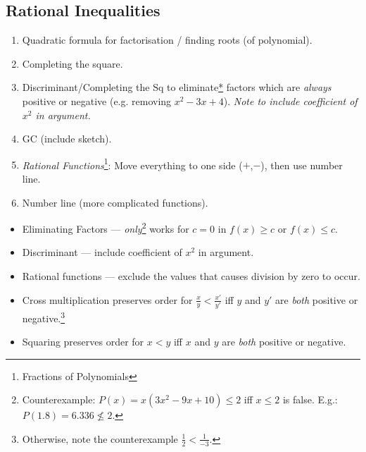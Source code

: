 \documentclass[oneside]{book}
\theoremstyle{definition}
\theoremstyle{plain}
\theoremstyle{remark}
\theoremstyle{plain}
\begin{document}
\subsection{Rational Inequalities}
\begin{tcolorbox}[
    colback=yellow!20,
    boxrule=1pt,
    boxsep=1pt,
    left=2pt,right=2pt,top=2pt,bottom=2pt,
    oversize=2pt,
    colframe=blue!75!black,
    before skip=\topsep,
    after skip=\topsep,
    title=General Methods,
]
    \begin{enumerate}
        \item Quadratic formula for factorisation / finding roots (of polynomial).
        \item Completing the square.
        \item Discriminant/Completing the Sq to eliminate{\hyperlink{INEQGM3}{*}} factors which are \emph{always} positive or negative (e.g. removing \(x^2-3x+4\)). \emph{Note to include coefficient of \(x^2\) in argument.}
        \item GC (include sketch).
        \item \emph{Rational Functions}\footnote{Fractions of Polynomials}: Move everything to one side (\(+\),\(-\)), then use number line.
        \item Number line (more complicated functions).
    \end{enumerate}
\end{tcolorbox}
\begin{IN}
    \begin{itemize}[label=\footnotesize \(\square\) \normalsize]
        \item \hypertarget{INEQGM3}{Eliminating Factors --- \emph{only}\footnote{Counterexample: \(P(x)=x(3x^2-9x+10) \leq 2\) iff \(x \leq 2\) is false. E.g.: \(P(1.8)=6.336 \not\leq 2\).} works for \(c=0\) in \(f(x) \geq c\) or \(f(x) \leq c\).}
        \item Discriminant --- include coefficient of \(x^2\) in argument.
        \item Rational functions --- exclude the values that causes division by zero to occur. 
        \item Cross multiplication preserves order for \(\frac{x}{y}<\frac{x'}{y'}\) iff \(y\) and \(y'\) are \emph{both} positive or negative.\footnote{Otherwise, note the counterexample \(\frac{1}{2}<\frac{1}{-3}\).}
        \item Squaring preserves order for \(x<y\) iff \(x\) and \(y\) are \emph{both} positive or negative.
    \end{itemize}
\end{IN}
\end{document}
